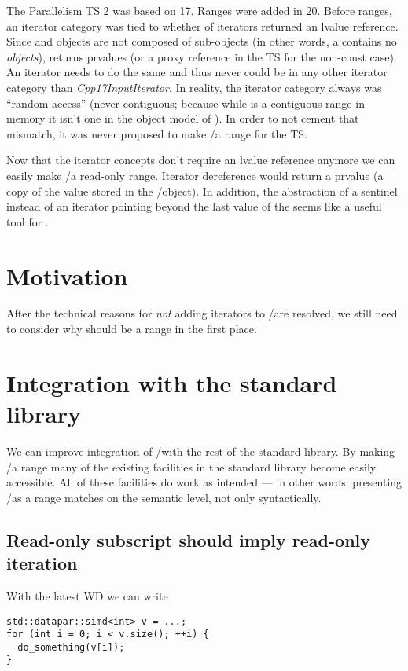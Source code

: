 The Parallelism TS 2 was based on \CC{}17.
Ranges were added in \CC{}20.
Before ranges, an iterator category was tied to whether  of iterators returned an
lvalue reference.
Since \simd and \mask objects are not composed of sub-objects (in other words, a 
contains no  \emph{objects}),  returns prvalues (or a proxy reference
in the TS for the non-const case).
An iterator needs to do the same and thus never could be in any other iterator category than
\emph{Cpp17InputIterator}.
In reality, the iterator category always was “random access” (never contiguous; because while \simd
is a contiguous range in memory it isn't one in the object model of \CC{}).
In order to not cement that mismatch, it was never proposed to make \simd/\mask a range for the TS.

Now that the iterator concepts don't require an lvalue reference anymore we can easily make
\simd/\mask a read-only range.
Iterator dereference would return a prvalue (a copy of the value stored in the \simd/\mask object).
In addition, the abstraction of a sentinel instead of an iterator pointing beyond the last value of
the \simd seems like a useful tool for \simd.

\section{Motivation}

After the technical reasons for \emph{not} adding iterators to \simd/\mask are resolved, we still
need to consider why \simd should be a range in the first place.

\section{Integration with the standard library}

We can improve integration of \simd/\mask with the rest of the standard library.
By making \simd/\mask a range many of the existing facilities in the standard library become
easily accessible.
All of these facilities do work as intended — in other words: presenting \simd/\mask as a range
matches on the semantic level, not only syntactically.

\subsection{Read-only subscript should imply read-only iteration}

With the latest WD we can write
\medskip\begin{lstlisting}
std::datapar::simd<int> v = ...;
for (int i = 0; i < v.size(); ++i) {
  do_something(v[i]);
}
\end{lstlisting}

